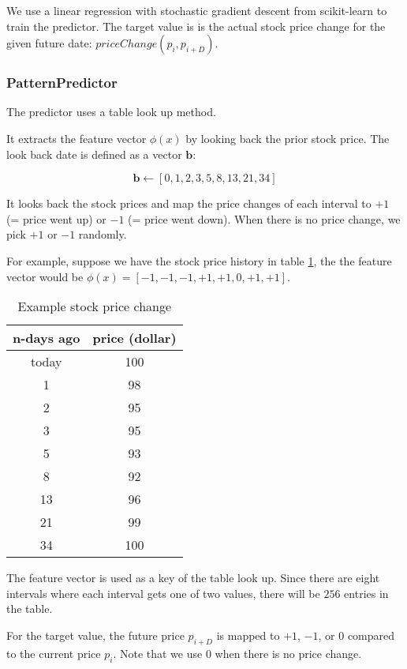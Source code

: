 \documentclass[twocolumn,10pt]{asme2ej}
\newcommand{\vect}[1]{\boldsymbol{#1}}
\begin{document}
We use a linear regression with stochastic gradient descent from
scikit-learn \cite{web:scikit_learn} to train the predictor. The
target value is is the actual stock price change for the given future
date: $priceChange(p_i, p_{i+D})$.

\subsubsection{PatternPredictor}

The predictor uses a table look up method.

It extracts the feature vector $\phi(x)$ by looking back the prior
stock price. The look back date is defined as a vector $\vect{b}$:

\[
\vect{b} \gets [0, 1, 2, 3, 5, 8, 13, 21, 34]
\]

It looks back the stock prices and map the price changes of each
interval to $+1$ (= price went up) or $-1$ (= price went down). When
there is no price change, we pick $+1$ or $-1$ randomly.

For example, suppose we have the stock price history in table
\ref{patternStockExample}, the the feature vector would be
$\phi(x)=[-1,-1,-1,+1,+1,0,+1,+1]$.

\begin{table}
  \begin{tabular}{cc}
    n-days ago & price (dollar) \\
    \hline
    today & 100 \\
    1 & 98 \\
    2 & 95 \\
    3 & 95 \\
    5 & 93 \\
    8 & 92 \\
    13 & 96 \\
    21 & 99 \\
    34 & 100 \\
  \end{tabular}
  \caption{Example stock price change}
  \label{patternStockExample}
\end{table}

The feature vector is used as a key of the table look up. Since there
are eight intervals where each interval gets one of two values, there
will be $256$ entries in the table.

For the target value, the future price $p_{i+D}$ is mapped to $+1$,
$-1$, or $0$ compared to the current price $p_i$. Note that we use $0$
when there is no price change.
\end{document}
